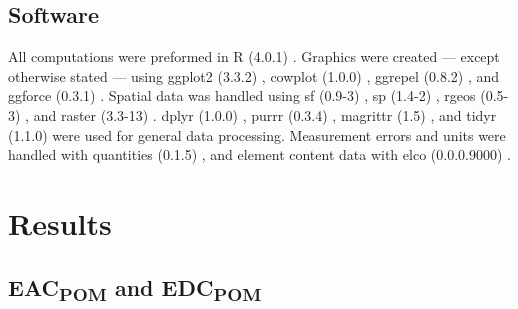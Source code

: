 \documentclass[alpha-refs]{wiley-article-rmd}
\begin{document}
\begin{refsection}
\hypertarget{software}{%
\subsection{Software}\label{software}}

All computations were preformed in R (4.0.1) \autocite{RCoreTeam.2020}. Graphics were created --- except otherwise stated --- using ggplot2 (3.3.2) \autocite{Wickham.2016}, cowplot (1.0.0) \autocite{Wilke.2019}, ggrepel (0.8.2) \autocite{Slowikowski.2020}, and ggforce (0.3.1) \autocite{Pedersen.2019}. Spatial data was handled using sf (0.9-3) \autocite{Pebesma.2018b}, sp (1.4-2) \autocite{Pebesma.2005}, rgeos (0.5-3) \autocite{Bivand.2020}, and raster (3.3-13) \autocite{Hijmans.2020}. dplyr (1.0.0) \autocite{Wickham.2020e}, purrr (0.3.4) \autocite{Henry.2020}, magrittr (1.5) \autocite{Bache.2014}, and tidyr (1.1.0) \autocite{Wickham.2020f} were used for general data processing. Measurement errors and units were handled with quantities (0.1.5) \autocite{Pebesma.2016,Ucar.2019}, and element content data with elco (0.0.0.9000) \autocite{Teickner.2020e}.

\hypertarget{results}{%
\section{Results}\label{results}}

\hypertarget{eac-and-edc}{%
\subsection{\texorpdfstring{EAC\textsubscript{POM} and EDC\textsubscript{POM}}{EAC and EDC}}\label{eac-and-edc}}


\end{refsection}
\end{document}
